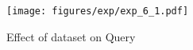 \documentclass[sigconf, nonacm]{acmart}
\begin{document}
	\begin{figure}
		\centering
		\texttt{[image: figures/exp/exp\_6\_1.pdf]}
		\caption{Effect of dataset on Query}
		\label{fig:exp_6_1}
	\end{figure}
	
	
		
	
\end{document}
